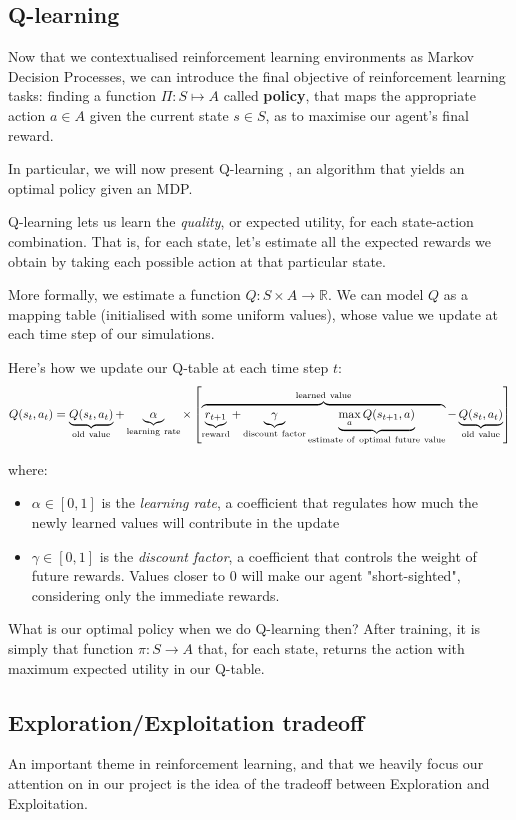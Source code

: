 \subsection{Q-learning}
\label{qlearning}
Now that we contextualised reinforcement learning environments as Markov Decision Processes, we can introduce the final objective of reinforcement learning tasks: finding a function $\Pi:S\mapsto A$ called \textbf{policy}, that maps the appropriate action $a\in A$ given the current state $s\in S$, as to maximise our agent's final reward.

In particular, we will now present Q-learning \parencite{watkins1992q}, an algorithm that yields an optimal policy given an MDP.

Q-learning lets us learn the \emph{quality}, or expected utility, for each state-action combination. That is, for each state, let's estimate all the expected rewards we obtain by taking each possible action at that particular state.

More formally, we estimate a function $Q: S \times A \to \mathbb{R}$. We can model $Q$ as a mapping table (initialised with some uniform values), whose value we update at each time step of our simulations.

Here's how we update our Q-table at each time step $t$:
  \[Q(s_{t},a_{t}) = \underbrace{Q(s_t,a_t)}_{\rm old~value} +
  \underbrace{\alpha}_{\rm learning~rate} \times \left[
    \overbrace{\underbrace{r_{t+1}}_{\rm reward} + \underbrace{\gamma}_{\rm
        discount~factor} \underbrace{\max_{a}Q(s_{t+1}, a)}_{\rm
        estimate~of~optimal~future~value}}^{\rm learned~value} -
    \underbrace{Q(s_t,a_t)}_{\rm old~value} \right] \]
    
where:
\begin{itemize}
	\item $\alpha\in[0,1]$ is the \emph{learning rate}, a coefficient that regulates how much the newly learned values will contribute in the update
	\item $\gamma\in[0,1]$ is the \emph{discount factor}, a coefficient that controls the weight of future rewards. Values closer to 0 will make our agent "short-sighted", considering only the immediate rewards.
\end{itemize}

What is our optimal policy when we do Q-learning then? After training, it is simply that function $\pi: S \to A$ that, for each state, returns the action with maximum expected utility in our Q-table.

\subsection{Exploration/Exploitation tradeoff}
An important theme in reinforcement learning, and that we heavily focus our attention on in our project is the idea of the tradeoff between Exploration and Exploitation.

